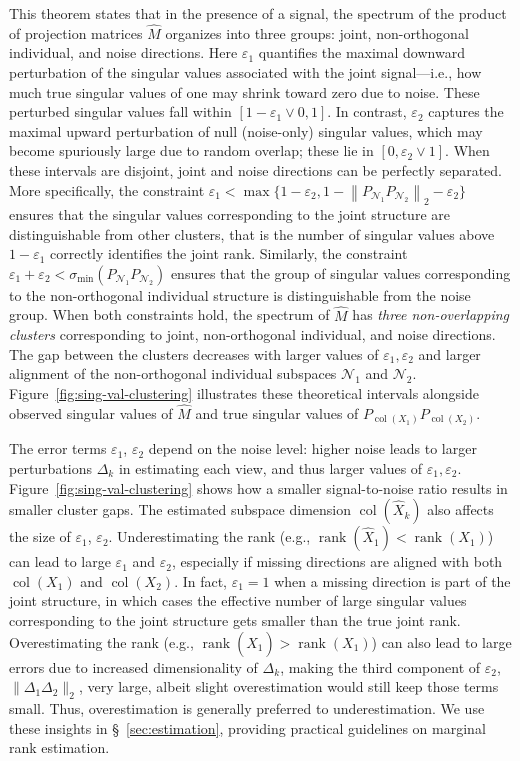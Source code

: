 \documentclass{amsart}
\DeclareMathOperator*{\col}{col}
\DeclareMathOperator*{\rank}{rank}
\newcommand{\Ncal}{\mathcal{N}}
\begin{document}
This theorem states that in the presence of a signal, the spectrum of the product of projection matrices $\widehat{M}$ organizes into three groups: joint, non-orthogonal individual, and noise directions. { Here $\varepsilon_1$ quantifies the maximal downward perturbation of the singular values associated with the joint signal—i.e., how much true singular values of one may shrink toward zero due to noise. These perturbed singular values fall within $[1 - \varepsilon_1 \vee 0, 1]$. In contrast, $\varepsilon_2$ captures the maximal upward perturbation of null (noise-only) singular values, which may become spuriously large due to random overlap; these lie in $[0, \varepsilon_2 \vee 1]$. When these intervals are disjoint, joint and noise directions can be perfectly separated. More specifically,} the constraint $\varepsilon_1 < \max\{1-\varepsilon_2, 1-\left\|P_{\Ncal_1} P_{\Ncal_2}\right\|_2-\varepsilon_2\}$ ensures that the singular values corresponding to the joint structure are distinguishable from other clusters, that is the number of singular values above $1-\varepsilon_1$ correctly identifies the joint rank. Similarly, the constraint $\varepsilon_1+\varepsilon_2 < \sigma_{\min}(P_{\Ncal_1} P_{\Ncal_2})$ ensures that the group of singular values corresponding to the non-orthogonal individual structure is distinguishable from the noise group. When both constraints hold, the spectrum of $\widehat{M}$ has \emph{three non-overlapping clusters} corresponding to joint, non-orthogonal individual, and noise directions. The gap between the clusters decreases with larger values of $\varepsilon_1,\varepsilon_2$ and larger alignment of the non-orthogonal individual subspaces ${\Ncal_1}$ and ${\Ncal_2}$. Figure~\ref{fig:sing-val-clustering} illustrates these theoretical intervals alongside observed singular values of $\widehat{M}$ and true singular values of $P_{\col (X_1)} P_{\col (X_2)}$.

The error terms $\varepsilon_1$, $\varepsilon_2$ depend on the noise level: higher noise leads to larger perturbations $\Delta_k$ in estimating each view, and thus larger values of $\varepsilon_1,\varepsilon_2$. Figure~\ref{fig:sing-val-clustering} shows how a smaller signal-to-noise ratio results in smaller cluster gaps. The estimated subspace dimension $\col(\widehat{X}_k)$ also affects the size of $\varepsilon_1$, $\varepsilon_2$. Underestimating the rank (e.g.,  $\rank(\widehat{X}_1) <\rank(X_1)$) can lead to large $\varepsilon_1$ and $\varepsilon_2$, especially if missing directions are aligned with both $\col(X_1)$ and $\col(X_2)$. In fact, $\varepsilon_1 = 1$ when a missing direction is part of the joint structure, in which cases the effective number of large singular values corresponding to the joint structure gets smaller than the true joint rank. Overestimating the rank (e.g.,  $\rank(\widehat{X}_1) > \rank(X_1)$) can also lead to large errors due to increased dimensionality of $\Delta_k$, making the third component of $\varepsilon_2$, $\|\Delta_1\Delta_2\|_2$, very large, albeit slight overestimation would still keep those terms small. Thus, overestimation is generally preferred to underestimation. We use these insights in \S~\ref{sec:estimation}, providing practical guidelines on marginal rank estimation.
\end{document}
